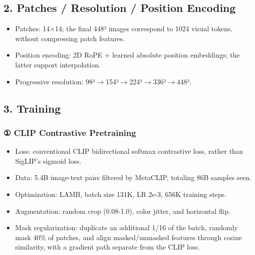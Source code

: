 \subsection{2.\allowbreak{} Patches /\allowbreak{} Resolution /\allowbreak{} Position Encoding}
\begin{itemize}
\item Patches: 14\(\times\)14; the final 448² images correspond to 1024 visual tokens, without compressing patch features.\allowbreak{}
\item Position encoding: 2D RoPE + learned absolute position embeddings; the latter support interpolation.\allowbreak{}
\item Progressive resolution: 98²\(\rightarrow\)154²\(\rightarrow\)224²\(\rightarrow\)336²\(\rightarrow\)448².\allowbreak{}
\end{itemize}
\subsection{3.\allowbreak{} Training}
\subsubsection{{①} CLIP Contrastive Pretraining}
\begin{itemize}
\item Loss: conventional CLIP bidirectional softmax contrastive loss, rather than SigLIP's sigmoid loss.\allowbreak{}
\item Data: 5.\allowbreak{}4B image-\allowbreak{}text pairs filtered by MetaCLIP, totaling 86B samples seen.\allowbreak{}
\item Optimization: LAMB, batch size 131K, LR 2e-\allowbreak{}3, 656K training steps.\allowbreak{}
\item Augmentation: random crop (0.\allowbreak{}08-1.\allowbreak{}0), color jitter, and horizontal flip.\allowbreak{}
\item Mask regularization: duplicate an additional 1/\allowbreak{}16 of the batch, randomly mask 40\% of patches, and align masked/\allowbreak{}unmasked features through cosine similarity, with a gradient path separate from the CLIP loss.\allowbreak{}
\end{itemize}
